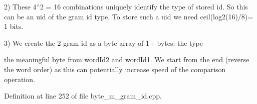 2) These 4$^\wedge$2 = 16 combinations uniquely identify the type of stored id. So this can be an uid of the gram id type. To store such a uid we need ceil(log2(16)/8)= 1 bits.

3) We create the 2-\/gram id as a byte array of 1+ bytes\+: the type
\begin{DoxyItemize}
\item the meaningful byte from word\+Id2 and word\+Id1. We start from the end (reverse the word order) as this can potentially increase speed of the comparison operation. 
\end{DoxyItemize}

Definition at line 252 of file byte\+\_\+m\+\_\+gram\+\_\+id.\+cpp.

\hypertarget{classuva_1_1smt_1_1bpbd_1_1server_1_1lm_1_1m__grams_1_1m__gram__id_1_1_byte___m___gram___id_a1e11cda9049d942ac9d528bff727e5da}{}
